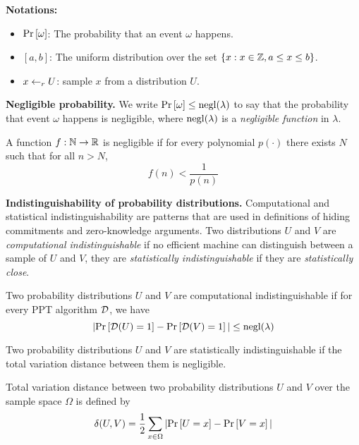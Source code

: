 \textbf{Notations:}
\begin{itemize}
    \item $\mathrm{Pr} \left[ \omega \right]$: The probability that an event $\omega$ happens.
    \item $[a, b]$: The uniform distribution over the set $\{ x : x \in \mathbb{Z}, a \le x \le b\}$.
    \item $x \gets_r U$: sample $x$ from a distribution $U$.
\end{itemize}

\textbf{Negligible probability.} We write $\mathrm{Pr} \left[ \omega \right] \le \mathrm{negl}(\lambda)$ to say that the probability that event $\omega$ happens is negligible, where $\mathrm{negl}(\lambda)$ is a \textit{negligible function} in $\lambda$.

\begin{definition}
A function $f: \mathbb{N} \to \mathbb{R}$ is \textup{negligible} if for every polynomial $p(\cdot)$ there exists $N$ such that for all $n > N$,
$$f(n) < \frac{1}{p(n)}$$
\end{definition}

\textbf{Indistinguishability of probability distributions.} Computational and statistical indistinguishability are patterns that are used in definitions of hiding commitments and zero-knowledge arguments. Two distributions $U$ and $V$ are \textit{computational indistinguishable} if no efficient machine can distinguish between a sample of $U$ and $V$, they are \textit{statistically indistinguishable} if they are \textit{statistically close}.

\begin{definition}
Two probability distributions $U$ and $V$ are \textup{computational indistinguishable} if for every PPT algorithm $\mathcal{D}$, we have
$$|\mathrm{Pr} \left[ \mathcal{D}(U) = 1 \right] - \mathrm{Pr} \left[ \mathcal{D}(V) = 1 \right]| \le \mathrm{negl}(\lambda)$$
\end{definition}

\begin{definition}
Two probability distributions $U$ and $V$ are \textup{statistically indistinguishable} if the \textup{total variation distance} between them is negligible.
\end{definition}

\begin{definition}
\textup{Total variation distance} between two probability distributions $U$ and $V$ over the sample space $\Omega$ is defined by
$$\delta(U, V) = \frac{1}{2} \sum_{x \in \Omega} |\mathrm{Pr} \left[ U = x \right] - \mathrm{Pr} \left[ V = x \right]|$$
\end{definition}

